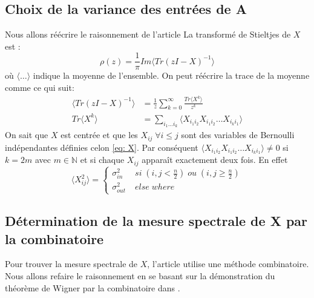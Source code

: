 \subsection{Choix de la variance des entrées de A}
Nous allons réécrire le raisonnement de l'article \cite[Graph spectra and the detectability of community structure in networks]{raj_rao}
La transformé de Stieltjes de $X$ est :
\begin{equation}
	\rho(z) = \frac{1}{\pi} Im\langle Tr(zI - X)^{-1}\rangle
\end{equation}
où $\langle \dots \rangle$ indique la moyenne de l'ensemble.
On peut réécrire la trace de la moyenne comme ce qui suit: 
\begin{align}
	\langle Tr(zI - X)^{-1}\rangle &= \frac{1}{z}\sum_{k=0}^{\infty} \frac{Tr\langle X^k\rangle}{z^k} \\
	Tr\langle X^k\rangle &= \sum_{i_1\dots i_k}\langle X_{i_1i_2}X_{i_1i_2}\dots X_{i_ki_1}\rangle \label{eq: trace Xk}
\end{align}
On sait que $X$ est centrée et que les $X_{ij} \; \forall i\leq j$ sont des variables de Bernoulli indépendantes définies celon \eqref{eq: X}.
Par conséquent $\langle X_{i_1i_2}X_{i_1i_2}\dots X_{i_ki_1}\rangle \neq 0$ si $k = 2m$ avec $m\in \mathbb{N}$ et si chaque $X_{ij}$ apparaît exactement deux fois.
En effet
\begin{equation}
	\langle X_{ij}^2\rangle = \left\{
	\begin{array}{lr}
		\sigma_{in}^2  &\; si \; (i,j < \frac{n}{2}) \; ou \; (i,j \ge \frac{n}{2}) \\
		\sigma_{out}^2 &\; else \; where
	\end{array}
\right.\nonumber
\end{equation}

\subsection{Détermination de la mesure spectrale de X par la combinatoire}
Pour trouver la mesure spectrale de $X$, l'article utilise une méthode combinatoire.
Nous allons refaire le raisonnement en se basant sur la démonstration du théorème de Wigner par la combinatoire dans \cite[Introduction aux matrices aléatoires]{wigner}.\\




